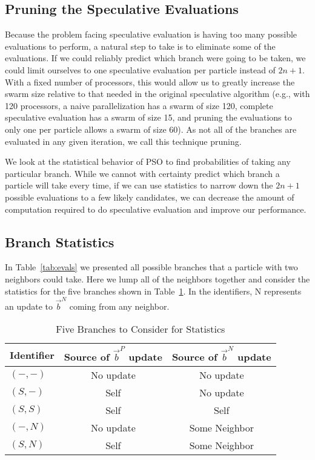 \documentclass[smallcondensed]{svjour3}
\providecommand{\pers}{\ensuremath{P}}
\providecommand{\neigh}{\ensuremath{N}}
\providecommand{\nbest}{\ensuremath{\Vec{b}^\neigh}}
\providecommand{\pbest}{\ensuremath{\Vec{b}^\pers}}
\providecommand{\casexn}{\ensuremath{(S,-)}}
\providecommand{\casexx}{\ensuremath{(S,S)}}
\providecommand{\casepn}{\ensuremath{(-,-)}}
\providecommand{\casepN}{\ensuremath{(-,N)}}
\providecommand{\casexN}{\ensuremath{(S,N)}}
\begin{document}
\subsection{Pruning the Speculative Evaluations}
\label{sec:pruning}

Because the problem facing speculative evaluation is having too many possible
evaluations to perform, a natural step to take is to eliminate some of the
evaluations.  If we could reliably predict which branch were going to be taken,
we could limit ourselves to one speculative evaluation per particle instead of
$2n+1$.  With a fixed number of processors, this would allow us to greatly
increase the swarm size relative to that needed in the original speculative
algorithm (e.g., with 120 processors, a naive parallelization has a swarm of
size 120, complete speculative evaluation has a swarm of size 15, and pruning
the evaluations to only one per particle allows a swarm of size 60).  As not
all of the branches are evaluated in any given iteration, we call this
technique pruning.

We look at the statistical behavior of PSO to find probabilities of taking any
particular branch.  While we cannot with certainty predict which branch a
particle will take every time, if we can use statistics to narrow down the
$2n+1$ possible evaluations to a few likely candidates, we can decrease the
amount of computation required to do speculative evaluation and improve our
performance.

\subsection{Branch Statistics}
\label{sec:statistics}

In Table~\ref{tab:evals} we presented all possible branches that a particle
with two neighbors could take.  Here we lump all of the neighbors together and
consider the statistics for the five branches shown in
Table~\ref{tab:branches}.  In the identifiers, N represents an update to
$\nbest$ coming from any neighbor.

\begin{table}[ht]
  \caption{Five Branches to Consider for Statistics}
  \label{tab:branches}
  \centering
  \begin{tabular}{lcc}
	Identifier&Source of $\pbest$ update&Source of $\nbest$ update\\
	\hline
	\hline
	$\casepn$&No update&No update\\
	\hline
	$\casexn$&Self&No update\\
	\hline
	$\casexx$&Self&Self\\
	\hline
	$\casepN$&No update&Some Neighbor\\
	\hline
	$\casexN$&Self&Some Neighbor\\
	\hline
  \end{tabular}
\end{table}
\end{document}
